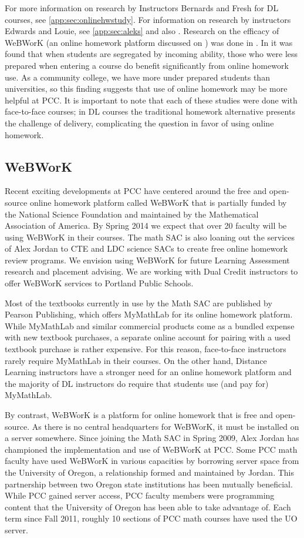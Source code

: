 For more information on research by Instructors Bernards and Fresh for DL
courses, see \vref{app:sec:onlinehwstudy}. For information on research by
instructors Edwards and Louie, see \vref{app:sec:aleks} and also
. Research on the efficacy of WeBWorK (an online
homework platform discussed on ) was done in
\cite{focuswebwork}.  In \cite{brewer} it was found that when students are
segregated by incoming ability, those who were less prepared when entering a
course do benefit significantly from online homework use. As a community
college, we have more under prepared students than universities, so this
finding suggests that use of online homework may be more helpful at PCC. It is
important to note that each of these studies were done with face-to-face
courses; in DL courses the traditional homework alternative presents the
challenge of delivery, complicating the question in favor of using online
homework.

\subsection{WeBWorK}\label{other:sec:webwork}
Recent exciting developments at PCC have centered around the free and
open-source online homework platform called WeBWorK that is partially funded by
the National Science Foundation and maintained by the Mathematical Association
of America. By Spring 2014 we expect that over 20 faculty will be using WeBWorK
in their courses. The math SAC is also loaning out the services of Alex Jordan
to CTE and LDC science SACs to create free online homework review programs. We
envision using WeBWorK for future Learning Assessment research and placement
advising. We are working with Dual Credit instructors to offer WeBWorK services
to Portland Public Schools.

Most of the textbooks currently in use by the Math SAC are published by Pearson
Publishing, which offers MyMathLab for its online homework platform. While
MyMathLab and similar commercial products come as a bundled expense with new
textbook purchases, a separate online account for pairing with a used textbook
purchase is rather expensive. For this reason, face-to-face instructors rarely
require MyMathLab in their courses. On the other hand, Distance Learning
instructors have a stronger need for an online homework platform and the
majority of DL instructors do require that students use (and pay for) MyMathLab.

By contrast, WeBWorK is a platform for online homework that is free and
open-source. As there is no central headquarters for WeBWorK, it must be
installed on a server somewhere. Since joining the Math SAC in Spring 2009,
Alex Jordan has championed the implementation and use of WeBWorK at PCC. Some
PCC math faculty have used WeBWorK in various capacities by borrowing server
space from the University of Oregon, a relationship formed and maintained by
Jordan. This partnership between two Oregon state institutions has been
mutually beneficial. While PCC gained server access, PCC faculty members were
programming content that the University of Oregon has been able to take advantage of. Each term since
Fall 2011, roughly 10 sections of PCC math courses have used the UO server.

